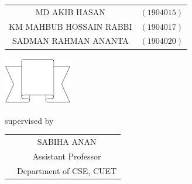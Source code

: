 \documentclass[a4paper,11pt]{report}
\begin{document}
\begin{titlepage}
{		\begin{tabular}{cl}
			MD AKIB HASAN           & $(1904015)$ \\
			KM MAHBUB HOSSAIN RABBI & $(1904017)$ \\
			SADMAN RAHMAN ANANTA    & $(1904020)$ \\
		\end{tabular}
	}
	\parbox[r]{8cm}{
		\vspace{.5cm}
		\begin{center}
			\includegraphics[width=3cm, keepaspectratio]{remarks.png}
		\end{center}
	}

	\vspace{2cm}
supervised by 
	\begin{tabular}{cc}
		& SABIHA ANAN         \\
		              & Assistant Professor \\
		              & Department of CSE, CUET\\

	\end{tabular}

	\vfill
\end{titlepage}
\end{document}
